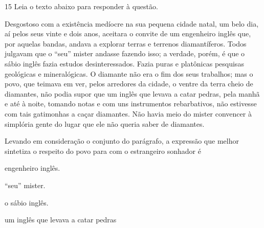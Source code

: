 \pagebreak

\num{15} Leia o texto abaixo para responder à questão. 


\begin{myquote}

Desgostoso com a existência medíocre na sua pequena cidade natal, 
um belo dia, aí pelos seus vinte e dois anos, aceitara o convite de um
engenheiro inglês que, por aquelas bandas, andava a explorar
terras e terrenos diamantíferos. Todos julgavam que o ``seu'' mister 
andasse fazendo isso; a verdade, porém, é que o sábio inglês fazia estudos
desinteressados. Fazia puras e platônicas pesquisas geológicas e mineralógicas.
O diamante não era o fim dos seus trabalhos; mas o povo, que teimava em ver,
pelos arredores da cidade, o ventre da terra cheio de diamantes, não podia 
supor que um inglês que levava a catar pedras, pela manhã e até à noite,
tomando notas e com uns instrumentos rebarbativos, não estivesse com tais 
gatimonhas a caçar diamantes. Não havia meio do mister convencer à simplória 
gente do lugar que ele não queria saber de diamantes. 


\end{myquote}

Levando em consideração o conjunto do parágrafo, a expressão que melhor 
sintetiza o respeito do povo para com o estrangeiro sonhador é

\begin{escolha}

    \item engenheiro inglês.

    \item ``seu'' mister.

    \item o sábio inglês. 

    \item um inglês que levava a catar pedras

\end{escolha}